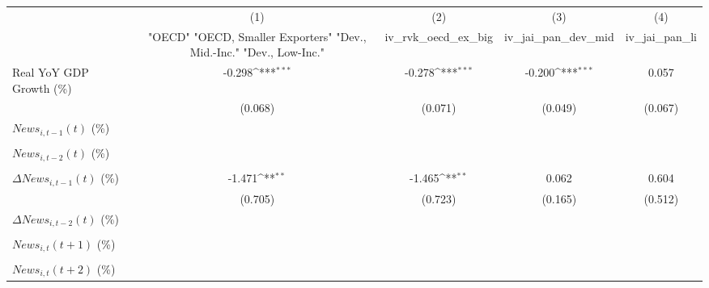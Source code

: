 {
\def\sym#1{\ifmmode^{#1}\else\(^{#1}\)\fi}
\begin{tabular}{l*{4}{c}}
\toprule
                    &\multicolumn{1}{c}{(1)}&\multicolumn{1}{c}{(2)}&\multicolumn{1}{c}{(3)}&\multicolumn{1}{c}{(4)}\\
                    &\multicolumn{1}{c}{ "OECD" "OECD, Smaller Exporters" "Dev., Mid.-Inc." "Dev., Low-Inc."}&\multicolumn{1}{c}{iv_rvk_oecd_ex_big}&\multicolumn{1}{c}{iv_jai_pan_dev_mid}&\multicolumn{1}{c}{iv_jai_pan_li}\\
\midrule
Real YoY GDP Growth (\%)&      -0.298\sym{***}&      -0.278\sym{***}&      -0.200\sym{***}&       0.057         \\
                    &     (0.068)         &     (0.071)         &     (0.049)         &     (0.067)         \\
\addlinespace
$ News_{i,t-1}(t)$ (\%)&                     &                     &                     &                     \\
                    &                     &                     &                     &                     \\
\addlinespace
$ News_{i,t-2}(t)$ (\%)&                     &                     &                     &                     \\
                    &                     &                     &                     &                     \\
\addlinespace
$ \Delta News_{i,t-1}(t)$ (\%)&      -1.471\sym{**} &      -1.465\sym{**} &       0.062         &       0.604         \\
                    &     (0.705)         &     (0.723)         &     (0.165)         &     (0.512)         \\
\addlinespace
$ \Delta News_{i,t-2}(t)$ (\%)&                     &                     &                     &                     \\
                    &                     &                     &                     &                     \\
\addlinespace
$ News_{i,t}(t+1)$ (\%)&                     &                     &                     &                     \\
                    &                     &                     &                     &                     \\
\addlinespace
$ News_{i,t}(t+2)$ (\%)&                     &                     &                     &                     \\

\end{tabular}}
